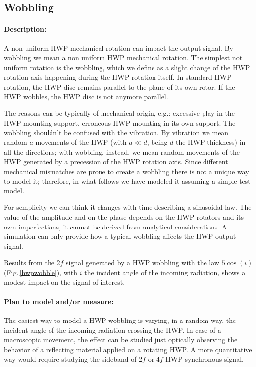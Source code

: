 \subsection{Wobbling}

\paragraph{Description:}
A non uniform HWP mechanical rotation can impact the output signal.
By wobbling we mean a non uniform HWP mechanical rotation. The simplest not uniform rotation is the wobbling, which
we define as a slight change of the HWP rotation axis happening during the HWP rotation itself. In standard HWP rotation, the HWP disc remains parallel to the plane
of its own rotor. If the HWP wobbles, the HWP disc is not anymore parallel.

The reasons can be typically of mechanical origin,
e.g.: excessive play in the HWP mounting support, erroneous HWP mounting in its own support. The wobbling shouldn't be confused with the vibration. By vibration we mean random $a$ movements of the HWP (with $a \ll d$, being $d$ the HWP thickness) in all the directions; with wobbling, instead, we mean random movements of the HWP generated by a precession of the HWP rotation axis. Since different mechanical mismatches are prone to create a wobbling there is not a unique way to model it; therefore, in what follows we have modeled it assuming a simple test model.

For semplicity we can think it changes with time describing
a sinusoidal law. The value of the amplitude and on the phase depends on the HWP rotators and its own imperfections, it cannot be derived
from analytical considerations. A simulation can only provide how a typical wobbling affects the HWP output signal.

Results from the 2$f$ signal generated by a HWP wobbling with the law $5\cos(i)$ (Fig.\,\ref{hwpwobble}), with $i$ the incident angle of the incoming radiation, shows a modest impact on the signal of interest.

\paragraph{Plan to model and/or measure:}
The easiest way to model a HWP wobbling is varying, in a random way, the incident angle of the incoming radiation crossing the HWP.
In case of a macroscopic movement, the effect can be studied just optically observing the behavior of a
reflecting material applied on a rotating HWP. A more quantitative way would require studying the
sideband of 2$f$ or 4$f$ HWP synchronous signal.


